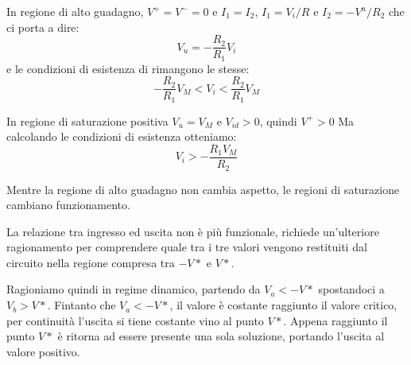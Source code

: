 \documentclass[../template]{subfiles}
\begin{document}
\begin{tcolorbox}
    In regione di alto guadagno, $V^+ = V^- = 0$ e $I_1 = I_2$, $I_1 = V_i / R$ e $I_2 = - V^u/R_2$ che ci porta a dire:
    \[
        V_u = -\frac{R_2}{R_1} V_i
    \]
    e le condizioni di esistenza di rimangono le stesse:
    \[
        -\frac{R_2}{R_1} V_M < V_i < \frac{R_2}{R_1} V_M
    \]
\end{tcolorbox}
\begin{tcolorbox}
    In regione di saturazione positiva $V_u = V_M$ e $V_{id} > 0$, quindi $V^+ > 0$
    Ma calcolando le condizioni di esistenza otteniamo:
    \[
        V_i > -\frac{R_1 V_M}{R_2}
    \]
\end{tcolorbox}
Mentre la regione di alto guadagno non cambia aspetto, le regioni di saturazione cambiano funzionamento.

\begin{center}
\end{center}

La relazione tra ingresso ed uscita non è più funzionale, richiede un'ulteriore ragionamento per comprendere quale tra i tre valori vengono restituiti dal circuito nella regione compresa tra $-V*$ e $V*$.

Ragioniamo quindi in regime dinamico, partendo da $V_a < -V*$ spostandoci a $V_b > V*$. Fintanto che $V_a < -V*$, il valore è costante raggiunto il valore critico, per continuità l'uscita si tiene costante vino al punto $V*$. Appena raggiunto il punto $V*$ è ritorna ad essere presente una sola soluzione, portando l'uscita al valore positivo.
\end{document}
